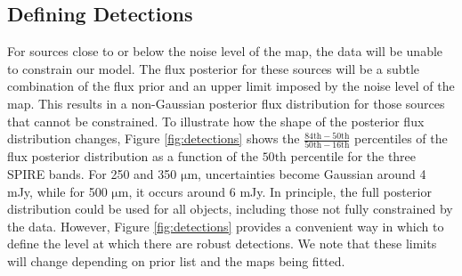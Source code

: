 \documentclass[useAMS,usenatbib]{mnras}
\begin{document}
\subsection{Defining Detections}\label{sec:dec}
For sources close to or below the noise level of the map, the data will be unable to constrain our model. The flux posterior for these sources will be a subtle combination of the flux prior and an upper limit imposed by the noise level of the map. This results in a non-Gaussian posterior flux distribution for those sources that cannot be constrained. To illustrate how the shape of the posterior flux distribution changes, Figure \ref{fig:detections} shows the $\frac{\mathrm{84th}-\mathrm{50th}}{\mathrm{50th-16th}}$ percentiles of the flux posterior distribution as a function of the $\mathrm{50th}$ percentile for the three SPIRE bands. For 250 and 350 $\mathrm{\mu m}$, uncertainties become Gaussian around 4 mJy, while for 500 $\mathrm{\mu m}$, it occurs around 6 mJy. In principle, the full posterior distribution could be used for all objects, including those not fully constrained by the data. However, Figure \ref{fig:detections} provides a convenient way in which to define the level at which there are robust detections. We note that these limits will change depending on prior list and the maps being fitted.
\end{document}

